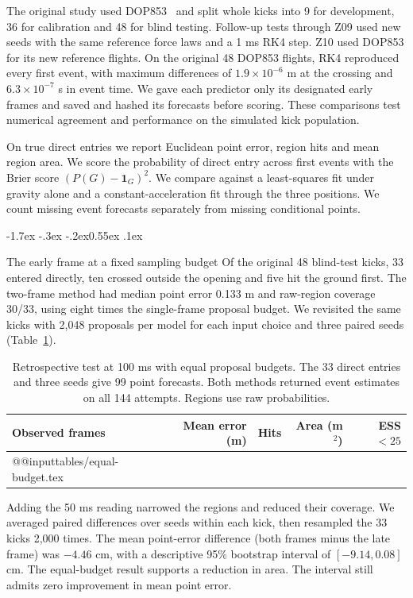 \documentclass[11pt,letterpaper]{article}
\makeatletter
\renewcommand{\subsection}{\reserveheadroom\@startsection{subsection}{2}{\z@}
  {-1.7ex \@plus -.3ex \@minus -.2ex}{0.55ex \@plus .1ex}
  {\normalfont\normalsize\sffamily\bfseries\color{black}\raggedright}}
\newcommand{\reserveheadroom}{\par\ifdim\dimexpr\pagegoal-\pagetotal\relax<5\baselineskip\newpage\fi}
\makeatother
\begin{document}
The original study used DOP853~\cite{scipy} and split whole kicks into 9 for development, 36 for calibration and 48 for blind testing. Follow-up tests through Z09 used new seeds with the same reference force laws and a 1 ms RK4 step. Z10 used DOP853 for its new reference flights. On the original 48 DOP853 flights, RK4 reproduced every first event, with maximum differences of \(1.9\times10^{-6}\) m at the crossing and \(6.3\times10^{-7}\) s in event time. We gave each predictor only its designated early frames and saved and hashed its forecasts before scoring. These comparisons test numerical agreement and performance on the simulated kick population.

On true direct entries we report Euclidean point error, region hits and mean region area. We score the probability of direct entry across first events with the Brier score \((P(G)-\mathbf1_G)^2\). We compare against a least-squares fit under gravity alone and a constant-acceleration fit through the three positions. We count missing event forecasts separately from missing conditional points.

\subsection{The early frame at a fixed sampling budget}
Of the original 48 blind-test kicks, 33 entered directly, ten crossed outside the opening and five hit the ground first. The two-frame method had median point error 0.133 m and raw-region coverage 30/33, using eight times the single-frame proposal budget. We revisited the same kicks with 2,048 proposals per model for each input choice and three paired seeds (Table~\ref{tab:budget}).

\begin{table}[htbp]\centering\small
\caption{Retrospective test at 100 ms with equal proposal budgets. The 33 direct entries and three seeds give 99 point forecasts. Both methods returned event estimates on all 144 attempts. Regions use raw probabilities.}
\label{tab:budget}
\begin{tabular}{@{}lrrrr@{}}\toprule
Observed frames & Mean error (m) & Hits & Area (m\(^2\)) & ESS $<25$\\\midrule
\csname @@input\endcsname tables/equal-budget.tex
\bottomrule\end{tabular}\end{table}

Adding the 50 ms reading narrowed the regions and reduced their coverage. We averaged paired differences over seeds within each kick, then resampled the 33 kicks 2,000 times. The mean point-error difference (both frames minus the late frame) was \(-4.46\) cm, with a descriptive 95\% bootstrap interval of \([-9.14,0.08]\) cm. The equal-budget result supports a reduction in area. The interval still admits zero improvement in mean point error.
\end{document}
